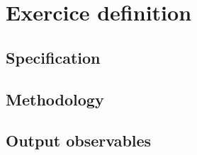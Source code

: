 \section{Exercice definition}



\subsection{Specification}

\subsection{Methodology}

\subsection{Output observables}


